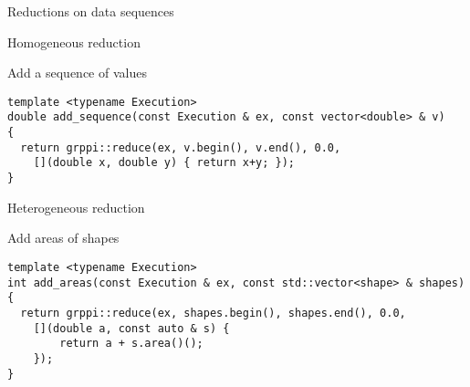 \begin{frame}[t]{Reductions on data sequences}
\begin{itemize}
\end{itemize}
\end{frame}

\begin{frame}[t,fragile]{Homogeneous reduction}
\begin{block}{Add a sequence of values}
\begin{lstlisting}
template <typename Execution>
double add_sequence(const Execution & ex, const vector<double> & v)
{
  return grppi::reduce(ex, v.begin(), v.end(), 0.0,
    [](double x, double y) { return x+y; });
}
\end{lstlisting}
\end{block}
\end{frame}

\begin{frame}[t,fragile]{Heterogeneous reduction}
\begin{block}{Add areas of shapes}
\begin{lstlisting}
template <typename Execution>
int add_areas(const Execution & ex, const std::vector<shape> & shapes)
{
  return grppi::reduce(ex, shapes.begin(), shapes.end(), 0.0,
    [](double a, const auto & s) { 
        return a + s.area()(); 
    });
}
\end{lstlisting}
\end{block}
\end{frame}
